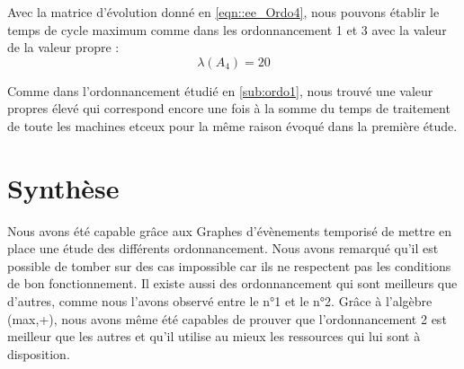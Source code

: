 Avec la matrice d'évolution donné en \ref{eqn::ee_Ordo4}, nous pouvons établir le temps de cycle maximum comme dans les ordonnancement 1 et 3 avec la valeur de la valeur propre :
\begin{equation}
\lambda(A_4) = 20
\end{equation}

Comme dans l'ordonnancement étudié en \ref{sub:ordo1}, nous trouvé une valeur propres élevé qui correspond encore une fois à la somme du temps de traitement de toute les machines etceux pour la même raison évoqué dans la première étude.

\section{Synthèse}
Nous avons été capable grâce aux Graphes d'évènements temporisé de mettre en place une étude des différents ordonnancement. Nous avons remarqué qu'il est possible de tomber sur des cas impossible car ils ne respectent pas les conditions de bon fonctionnement. Il existe aussi des ordonnancement qui sont meilleurs que d'autres, comme nous l'avons observé entre le n°1 et le n°2. Grâce à l'algèbre (max,+), nous avons même été capables de prouver que l'ordonnancement 2 est meilleur que les autres et qu'il utilise au mieux les ressources qui lui sont à disposition. 